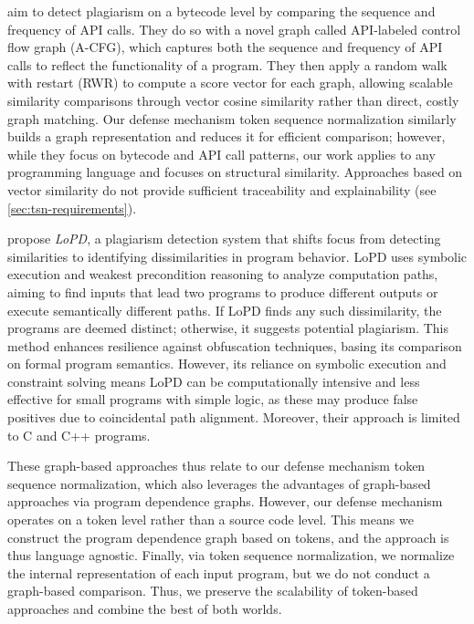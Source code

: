 \citet{chae2013} aim to detect plagiarism on a bytecode level by comparing the sequence and frequency of API calls. They do so with a novel graph called API-labeled control flow graph (A-CFG), which captures both the sequence and frequency of API calls to reflect the functionality of a program. They then apply a random walk with restart (RWR) to compute a score vector for each graph, allowing scalable similarity comparisons through vector cosine similarity rather than direct, costly graph matching.
%
Our defense mechanism token sequence normalization similarly builds a graph representation and reduces it for efficient comparison; however, while they focus on bytecode and API call patterns, our work applies to any programming language and focuses on structural similarity. Approaches based on vector similarity do not provide sufficient traceability and explainability (see \autoref{sec:tsn-requirements}).


\citet{zhang2014} propose \emph{LoPD}, a plagiarism detection system that shifts focus from detecting similarities to identifying dissimilarities in program behavior. LoPD uses symbolic execution and weakest precondition reasoning to analyze computation paths, aiming to find inputs that lead two programs to produce different outputs or execute semantically different paths. If LoPD finds any such dissimilarity, the programs are deemed distinct; otherwise, it suggests potential plagiarism. This method enhances resilience against obfuscation techniques, basing its comparison on formal program semantics.
However, its reliance on symbolic execution and constraint solving means LoPD can be computationally intensive and less effective for small programs with simple logic, as these may produce false positives due to coincidental path alignment. Moreover, their approach is limited to C and C++ programs.

These graph-based approaches thus relate to our defense mechanism token sequence normalization, which also leverages the advantages of graph-based approaches via program dependence graphs. However, our defense mechanism operates on a token level rather than a source code level. This means we construct the program dependence graph based on tokens, and the approach is thus language agnostic. Finally, via token sequence normalization, we normalize the internal representation of each input program, but we do not conduct a graph-based comparison. Thus, we preserve the scalability of token-based approaches and combine the best of both worlds.

